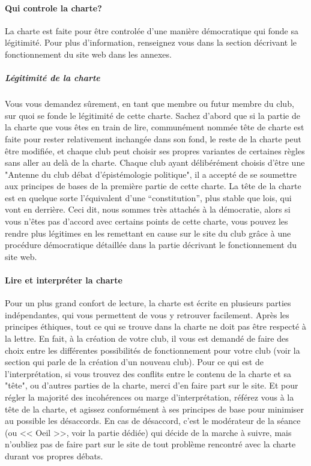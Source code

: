 \documentclass[a4paper,11pt]{article}
\begin{document}
\paragraph{Qui controle la charte?}
La charte est faite pour être controlée d'une manière démocratique qui fonde sa légitimité. Pour plus d'information, renseignez vous dans la section décrivant le fonctionnement du site web dans les annexes.
\subparagraph{Légitimité de la charte}
Vous vous demandez sûrement, en tant que membre ou futur membre du club, sur quoi se fonde le légitimité de cette charte. Sachez d'abord que si la partie de la charte que vous êtes en train de lire, communément nommée tête de charte est faite pour rester relativement inchangée dans son fond, le reste de la charte peut être modifiée, et chaque club peut choisir ses propres variantes de certaines règles sans aller au delà de la charte. Chaque club ayant délibérément choisis d'être une "Antenne du club débat d'épistémologie politique", il a accepté de se soumettre aux principes de bases de la première partie de cette charte. La tête de la charte est en quelque sorte l'équivalent d'une ``constitution'', plus stable que lois, qui vont en derrière. Ceci dit, nous sommes très attachés à la démocratie, alors si vous n'êtes pas d'accord avec certains points de cette charte, vous pouvez les rendre plus légitimes en les remettant en cause sur le site du club grâce à une procédure démocratique détaillée dans la partie décrivant le fonctionnement du site web.

\paragraph{Lire et interpréter la charte}
Pour un plus grand confort de lecture, la charte est écrite en plusieurs parties indépendantes, qui vous permettent de vous y retrouver facilement. Après les principes éthiques, tout ce qui se trouve dans la charte ne doit pas être respecté à la lettre. En fait, à la création de votre club, il vous est demandé de faire des choix entre les différentes possibilités de fonctionnement pour votre club (voir la section qui parle de la création d'un nouveau club). Pour ce qui est de l'interprétation, si vous trouvez des conflits entre le contenu de la charte et sa "tête", ou d'autres parties de la charte, merci d'en faire part sur le site. Et pour régler la majorité des incohérences ou marge d'interprétation, référez vous à la tête de la charte, et agissez conformément à ses principes de base pour minimiser au possible les désaccords. En cas de désaccord, c'est le modérateur de la séance (ou << Oeil >>, voir la partie dédiée) qui décide de la marche à suivre, mais n'oubliez pas de faire part sur le site de tout problème rencontré avec la charte durant vos propres débats.
\end{document}
